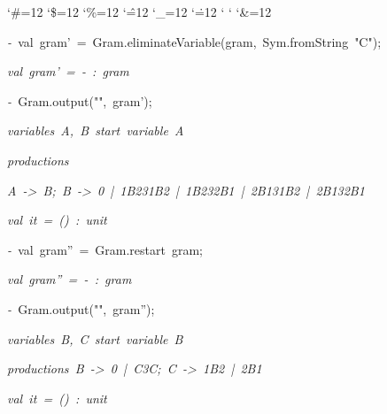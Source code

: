 \begin{list}{}
{\setlength{\leftmargin}{\leftmargini}
\setlength{\rightmargin}{0cm}
\setlength{\itemindent}{0cm}
\setlength{\listparindent}{0cm}
\setlength{\itemsep}{0cm}
\setlength{\parsep}{0cm}
\setlength{\labelsep}{0cm}
\setlength{\labelwidth}{0cm}
\catcode`\#=12
\catcode`\$=12
\catcode`\%=12
\catcode`\^=12
\catcode`\_=12
\catcode`\.=12
\catcode`
\catcode`
\catcode`\&=12
\ttfamily}
\small
\item[]\textsl{-\ }val\ gram'\ =\ Gram.eliminateVariable(gram,\ Sym.fromString\ "C");
\item[]\textsl{val\ gram'\ =\ -\ :\ gram}
\item[]\textsl{-\ }Gram.output("",\ gram');
\item[]\textsl{variables\ A,\ B\ start\ variable\ A}
\item[]\textsl{productions}
\item[]\textsl{A\ ->\ B;\ B\ ->\ 0\ |\ 1B231B2\ |\ 1B232B1\ |\ 2B131B2\ |\ 2B132B1}
\item[]\textsl{val\ it\ =\ ()\ :\ unit}
\item[]\textsl{-\ }val\ gram''\ =\ Gram.restart\ gram;
\item[]\textsl{val\ gram''\ =\ -\ :\ gram}
\item[]\textsl{-\ }Gram.output("",\ gram'');
\item[]\textsl{variables\ B,\ C\ start\ variable\ B}
\item[]\textsl{productions\ B\ ->\ 0\ |\ C3C;\ C\ ->\ 1B2\ |\ 2B1}
\item[]\textsl{val\ it\ =\ ()\ :\ unit}
\end{list}
